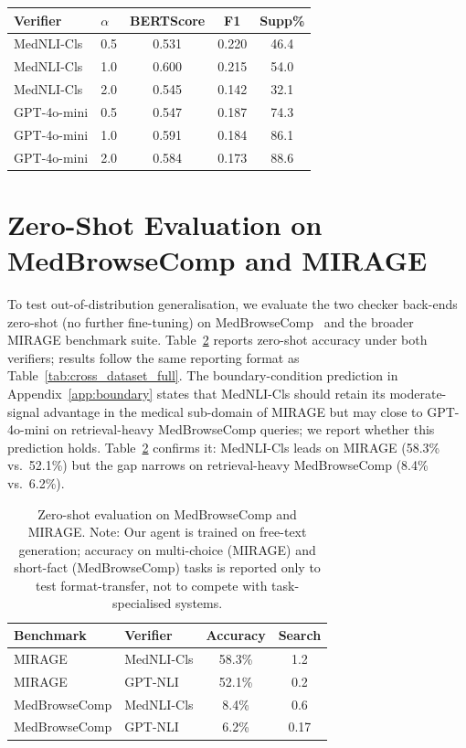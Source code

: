 \documentclass[11pt]{article}
\begin{document}
\begin{table}[h]
\centering\small
\setlength{\tabcolsep}{5pt}
\renewcommand{\arraystretch}{1.15}
\begin{tabular}{@{}llccc@{}}
\toprule
\textbf{Verifier} & \textbf{$\alpha$} & \textbf{BERTScore} & \textbf{F1} & \textbf{Supp\%} \\
\midrule
MedNLI-Cls & 0.5 & 0.531 & 0.220 & 46.4\\
MedNLI-Cls & 1.0 & 0.600 & 0.215 & 54.0 \\
MedNLI-Cls & 2.0 & 0.545 & 0.142 & 32.1 \\
\midrule
GPT-4o-mini       & 0.5 & 0.547 & 0.187 & 74.3 \\
GPT-4o-mini       & 1.0 & 0.591 & 0.184 & 86.1 \\
GPT-4o-mini       & 2.0 & 0.584 & 0.173 & 88.6 \\
\bottomrule
\end{tabular}

\label{tab:alpha}
\end{table}

\section{Zero-Shot Evaluation on MedBrowseComp and MIRAGE}
\label{app:medbrowsecomp}

To test out-of-distribution generalisation, we  
evaluate the two checker back-ends zero-shot
(no further fine-tuning) on
MedBrowseComp~\citep{xiong2024benchmarking,chen2025medbrowsecomp} and the broader MIRAGE benchmark suite. Table~\ref{tab:medbrowsecomp} reports zero-shot accuracy under both verifiers; results follow the same reporting format as Table~\ref{tab:cross_dataset_full}. The boundary-condition prediction in Appendix~\ref{app:boundary} states that MedNLI-Cls should retain its moderate-signal advantage in the medical sub-domain of MIRAGE but may close to GPT-4o-mini on retrieval-heavy MedBrowseComp queries; we report whether this prediction holds.
Table~\ref{tab:medbrowsecomp} confirms it: MedNLI-Cls 
leads on MIRAGE (58.3\% vs.\ 52.1\%) but the gap 
narrows on retrieval-heavy MedBrowseComp 
(8.4\% vs.\ 6.2\%).

\begin{table}[h]
\centering\small
\setlength{\tabcolsep}{5pt}
\renewcommand{\arraystretch}{1.15}
\begin{tabular}{@{}llcc@{}}
\toprule
\textbf{Benchmark} & \textbf{Verifier} & \textbf{Accuracy} & \textbf{Search} \\
\midrule
MIRAGE        & MedNLI-Cls & 58.3\% & 1.2 \\
MIRAGE        & GPT-NLI       & 52.1\% & 0.2 \\
MedBrowseComp & MedNLI-Cls & 8.4\% & 0.6 \\
MedBrowseComp & GPT-NLI      & 6.2\% & 0.17 \\
\bottomrule
\end{tabular}
\caption{Zero-shot evaluation on MedBrowseComp
and MIRAGE. Note: Our agent is trained on free-text generation; accuracy on multi-choice (MIRAGE) and short-fact (MedBrowseComp) tasks is reported only to test format-transfer, not to compete with task-specialised systems.}
\label{tab:medbrowsecomp}
\end{table}
\end{document}
